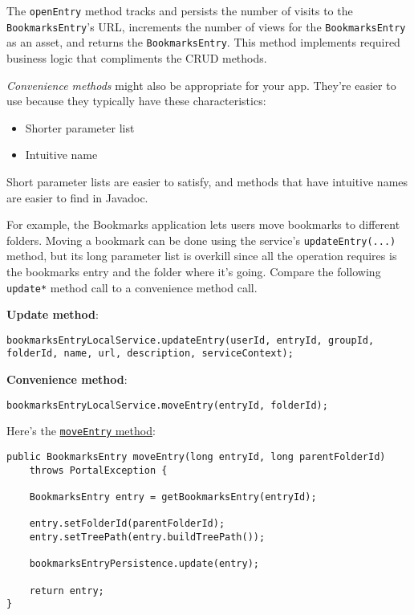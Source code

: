 The \texttt{openEntry} method tracks and persists the number of visits
to the \texttt{BookmarksEntry}'s URL, increments the number of views for
the \texttt{BookmarksEntry} as an asset, and returns the
\texttt{BookmarksEntry}. This method implements required business logic
that compliments the CRUD methods.

\emph{Convenience methods} might also be appropriate for your app.
They're easier to use because they typically have these characteristics:

\begin{itemize}
\tightlist
\item
  Shorter parameter list
\item
  Intuitive name
\end{itemize}

Short parameter lists are easier to satisfy, and methods that have
intuitive names are easier to find in Javadoc.

For example, the Bookmarks application lets users move bookmarks to
different folders. Moving a bookmark can be done using the service's
\texttt{updateEntry(...)} method, but its long parameter list is
overkill since all the operation requires is the bookmarks entry and the
folder where it's going. Compare the following \texttt{update*} method
call to a convenience method call.

\textbf{Update method}:

\begin{verbatim}
bookmarksEntryLocalService.updateEntry(userId, entryId, groupId, folderId, name, url, description, serviceContext);
\end{verbatim}

\textbf{Convenience method}:

\begin{verbatim}
bookmarksEntryLocalService.moveEntry(entryId, folderId);
\end{verbatim}

Here's the
\href{https://github.com/liferay/liferay-portal/blob/7.2.x/modules/apps/bookmarks/bookmarks-service/src/main/java/com/liferay/bookmarks/service/impl/BookmarksEntryLocalServiceImpl.java}{\texttt{moveEntry}
method}:

\begin{verbatim}
public BookmarksEntry moveEntry(long entryId, long parentFolderId)
    throws PortalException {

    BookmarksEntry entry = getBookmarksEntry(entryId);

    entry.setFolderId(parentFolderId);
    entry.setTreePath(entry.buildTreePath());

    bookmarksEntryPersistence.update(entry);

    return entry;
}
\end{verbatim}

